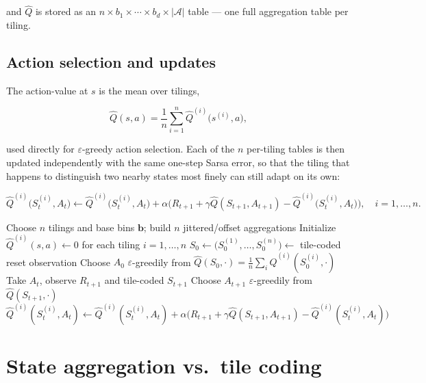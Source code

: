 \documentclass[11pt]{article}
\begin{document}
and $\hat{Q}$ is stored as an $n \times b_1 \times \cdots \times b_d \times
|\mathcal{A}|$ table — one full aggregation table per tiling.

\subsection{Action selection and updates}

The action-value at $s$ is the mean over tilings,

\[
    \hat{Q}(s, a) = \frac{1}{n}\sum_{i=1}^n \hat{Q}^{(i)}\big(s^{(i)}, a\big),
\]

used directly for $\varepsilon$-greedy action selection. Each of the $n$
per-tiling tables is then updated independently with the same one-step
Sarsa error, so that the tiling that happens to distinguish two nearby
states most finely can still adapt on its own:

\[
    \hat{Q}^{(i)}\big(S_t^{(i)}, A_t\big) \leftarrow
    \hat{Q}^{(i)}\big(S_t^{(i)}, A_t\big) + \alpha \Big( R_{t+1} + \gamma \hat{Q}(S_{t+1}, A_{t+1}) - \hat{Q}^{(i)}\big(S_t^{(i)}, A_t\big) \Big), \quad i = 1, \dots, n.
\]

\begin{algorithm}[h]
\caption{Sarsa with tile coding}
\begin{algorithmic}[1]
\State Choose $n$ tilings and base bins $\mathbf{b}$; build $n$ jittered/offset aggregations
\State Initialize $\hat{Q}^{(i)}(s,a) \leftarrow 0$ for each tiling $i = 1,\dots,n$
    \State $S_0 \leftarrow \big(S_0^{(1)}, \dots, S_0^{(n)}\big) \leftarrow$ tile-coded reset observation
    \State Choose $A_0$ $\varepsilon$-greedily from $\hat{Q}(S_0, \cdot) = \frac{1}{n}\sum_i \hat{Q}^{(i)}(S_0^{(i)}, \cdot)$
        \State Take $A_t$, observe $R_{t+1}$ and tile-coded $S_{t+1}$
        \State Choose $A_{t+1}$ $\varepsilon$-greedily from $\hat{Q}(S_{t+1}, \cdot)$
            \State $\hat{Q}^{(i)}(S_t^{(i)}, A_t) \leftarrow \hat{Q}^{(i)}(S_t^{(i)}, A_t) + \alpha \big( R_{t+1} + \gamma \hat{Q}(S_{t+1}, A_{t+1}) - \hat{Q}^{(i)}(S_t^{(i)}, A_t) \big)$
        \EndFor
    \EndFor
\EndFor
\end{algorithmic}
\end{algorithm}

\section{State aggregation vs.\ tile coding}
\end{document}
